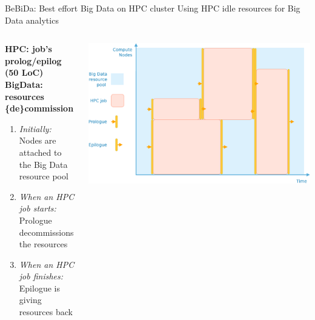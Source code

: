 \documentclass[10pt, compress, titleprogressbar, aspectratio=169]{beamer}
\begin{document}
        \begin{frame}{BeBiDa: Best effort Big Data on HPC cluster}{%
                Using HPC idle resources for Big Data analytics}
                \begin{columns}
                    \begin{column}{0.40\textwidth}
                        \textbf{HPC: job's prolog/epilog (50 LoC)\\
                        \vspace{1em}
                        BigData: resources \{de\}commission}
                        \vspace{1em}
                        \begin{enumerate}
                            \item \textit{Initially:}\\Nodes are attached to the Big Data resource pool
                                \vspace{1em}
                            \item \textit{When an HPC job starts:}\\Prologue decommissions the resources
                                \vspace{1em}
                            \item \textit{When an HPC job finishes:}\\Epilogue is giving resources back
                        \end{enumerate}
                    \end{column}
                    \begin{column}{0.60\textwidth}
                        \begin{center}
                            \includegraphics[width=\linewidth,height=\textheight,keepaspectratio]{./img/BeBiDa_gantt_blind.eps}
                        \end{center}
                    \end{column}
                \end{columns}
        \end{frame}
\end{document}
